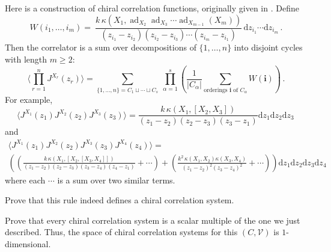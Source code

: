 \documentclass[12pt,letterpaper,reqno]{amsart}
\numberwithin{equation}{section}
\newcommand{\de}{\mathrm{d}}
\newcommand{\vertex}{\mathcal{V}}
\newcommand{\abs}[1]{\lvert#1\rvert}
\newcommand{\IP}[1]{\langle#1\rangle}
\DeclareMathOperator{\ad}{ad}
\DeclareRobustCommand{\fixme}[1]{\leavevmode{\color{orange}[#1]}}
\begin{document}
\begin{example}

Here is a construction of chiral correlation functions, originally given in \cite{FrenkelZhu1992}.
\fixme{check factors, signs}
Define
\[
W(i_1, \dots, i_m) =\
\frac{k \, \kappa(X_1,\ad_{X_2}\ad_{X_3}\cdots \ad_{X_{m-1}}(X_m))}{(z_{i_1}-z_{i_2})(z_{i_2}-z_{i_3})\cdots(z_{i_m}-z_{i_1})} \, \de z_{i_1} \cdots \de z_{i_m} \, .
\]
Then the correlator is a sum over decompositions
of $\{1, \dots, n\}$ into disjoint cycles with 
length $m \ge 2$:
\[
\Big\langle \prod_{r=1}^n J^{X_r}(z_r)\Big\rangle
=
\sum_{\{1,\dots,n\} = C_1\sqcup\cdots\sqcup C_s}
\ \prod_{\alpha=1}^s \left( \frac{1}{\abs{C_\alpha}} \sum_{\text{orderings }\mathbf{i}\text{ of }C_\alpha} W(\mathbf{i}) \right) \, .
\]
For example,
\begin{equation}
  \IP{J^{X_1}(z_1) J^{X_2}(z_2) J^{X_3}(z_3)} = \frac{k \, \kappa(X_1, [X_2,X_3])}{(z_1 - z_2)(z_2 - z_3)(z_3 - z_1)} \de z_1 \de z_2 \de z_3 \, 
\end{equation}
and
\begin{multline}
  \IP{J^{X_1}(z_1) J^{X_2}(z_2) J^{X_3}(z_3) J^{X_4}(z_4)} = \\ 
  \left( \left( \frac{k \, \kappa(X_1, [X_2, [X_3,X_4]])}{(z_1 - z_2)(z_2 - z_3)(z_3 - z_4)(z_4 - z_1)} + \cdots \right) + \left(  \frac{k^2 \, \kappa(X_1,X_2) \kappa(X_3,X_4)}{(z_1 - z_2)^2 (z_3 - z_4)^2} + \cdots \right) \right) \de z_1 \de z_2 \de z_3 \de z_4 
\end{multline}
where each $\cdots$ is a sum over two similar terms.

\begin{exercise} Prove that this rule indeed defines
a chiral correlation system.
\end{exercise}

\begin{exercise} Prove that every 
chiral correlation system
is a scalar multiple of the one we just described. Thus, the space of chiral correlation systems
for this $(C,\vertex)$ is $1$-dimensional.
\end{exercise}




\end{example}
\end{document}
